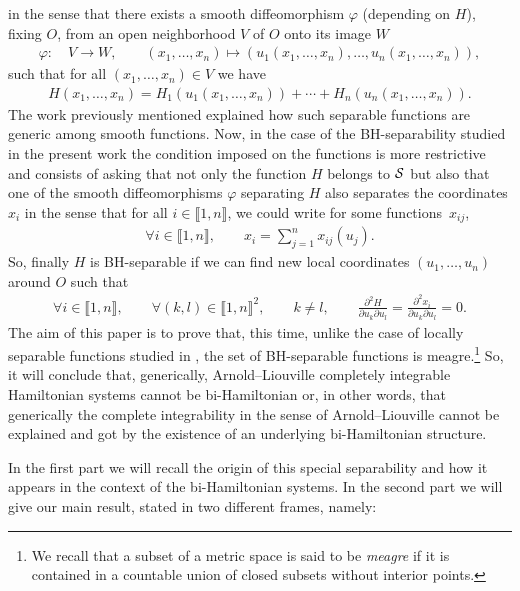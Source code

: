 \documentclass[pdftex]{sigma}%
\numberwithin{equation}{section}
\begin{document}
in the sense that there exists a smooth diffeomorphism $\varphi$ (depending on $H$), fixing $O$, from an open neighborhood $V$ of $O$ onto its image $W$
\begin{gather*}
\varphi\colon\quad V\to W,\qquad
(x_1,\dots,x_n)\mapsto(u_1(x_1,\dots,x_n),\dots,u_n(x_1,\dots,x_n)),
\end{gather*}
such that for all $(x_1,\dots,x_n)\in V$ we have
\begin{gather*}
H(x_1,\dots,x_n)=H_1(u_1(x_1,\dots,x_n))+\cdots+H_n(u_n(x_1,\dots,x_n)).
\end{gather*}
The work previously mentioned explained how such separable functions are generic among smooth functions.
Now, in the case of the BH-separability studied in the present work the condition imposed on the functions is more restrictive and consists of asking that not only the function $H$ belongs to ${\cal S}$ but also that one of the smooth diffeomorphisms $\varphi$ separating $H$ also separates the coordinates $x_i$ in the sense that for all $i\in\llbracket 1,n\rrbracket$, we could write for some functions~$x_{ij}$,
\begin{gather*}
\forall i\in\llbracket 1,n\rrbracket,\qquad
x_i=\sum_{j=1}^nx_{ij}(u_j).
\end{gather*}
So, finally $H$ is BH-separable if we can find new local coordinates $(u_1,\dots,u_n)$ around $O$ such that
\begin{gather*}
\forall i\in\llbracket 1,n\rrbracket,\qquad \forall (k,l)\in\llbracket 1,n\rrbracket^2, \qquad k\not=l,\qquad \frac{\partial^2 H}{\partial u_k\partial u_l}= \frac{\partial^2 x_i}{\partial u_k\partial u_l}=0.
\end{gather*}
The aim of this paper is to prove that, this time, unlike the case of locally separable functions studied in \cite{BouBr}, the set of BH-separable functions is meagre.\footnote{We recall that a subset of a metric space is said to be {\it meagre} if it is contained in a countable union of closed subsets without interior points.} So, it will conclude that, generically, Arnold--Liouville completely integrable Hamiltonian systems cannot be bi-Hamiltonian or, in other words, that generically the complete integrability in the sense of Arnold--Liouville cannot be explained and got by the existence of an underlying bi-Hamiltonian structure.

In the first part we will recall the origin of this special separability and how it appears in the context of the bi-Hamiltonian systems. In the second part we will give our main result, stated in two different frames, namely:
\end{document}
